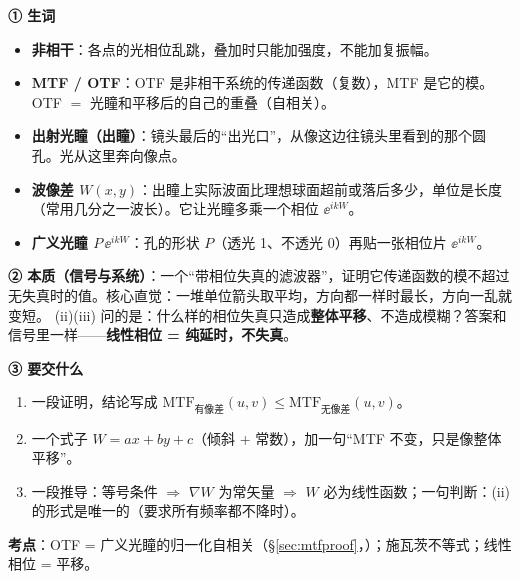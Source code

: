 \label{rd:v-mtf}
\begin{idea}[读题：概念与要交什么]
\textbf{① 生词}
\begin{itemize}
\item \textbf{非相干}：各点的光相位乱跳，叠加时只能加强度，不能加复振幅。
\item \textbf{MTF / OTF}：OTF 是非相干系统的传递函数（复数），MTF 是它的模。OTF $=$ 光瞳和平移后的自己的重叠（自相关）。
\item \textbf{出射光瞳（出瞳）}：镜头最后的“出光口”，从像这边往镜头里看到的那个圆孔。光从这里奔向像点。
\item \textbf{波像差 $W(x,y)$}：出瞳上实际波面比理想球面超前或落后多少，单位是长度（常用几分之一波长）。它让光瞳多乘一个相位 $\ee^{ikW}$。
\item \textbf{广义光瞳 $P\,\ee^{ikW}$}：孔的形状 $P$（透光 1、不透光 0）再贴一张相位片 $\ee^{ikW}$。
\end{itemize}
\textbf{② 本质（信号与系统）}：一个“带相位失真的滤波器”，证明它传递函数的模不超过无失真时的值。核心直觉：一堆单位箭头取平均，方向都一样时最长，方向一乱就变短。
(ii)(iii) 问的是：什么样的相位失真只造成\textbf{整体平移}、不造成模糊？答案和信号里一样——\textbf{线性相位 = 纯延时，不失真}。

\textbf{③ 要交什么}
\begin{enumerate}[label=(\roman*)]
\item 一段证明，结论写成 $\mathrm{MTF}_{\text{有像差}}(u,v)\le\mathrm{MTF}_{\text{无像差}}(u,v)$。
\item 一个式子 $W=ax+by+c$（倾斜 + 常数），加一句“MTF 不变，只是像整体平移”。
\item 一段推导：等号条件 $\Rightarrow$ $\nabla W$ 为常矢量 $\Rightarrow$ $W$ 必为线性函数；一句判断：(ii) 的形式是唯一的（要求所有频率都不降时）。
\end{enumerate}
\end{idea}


\textbf{考点}：OTF = 广义光瞳的归一化自相关（§\ref{sec:mtfproof}，\pageref{sec:mtfproof}）；施瓦茨不等式；线性相位 = 平移。

